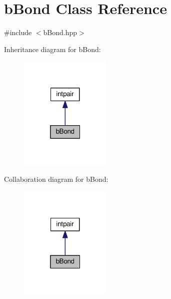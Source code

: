 \hypertarget{classbBond}{}\section{b\+Bond Class Reference}
\label{classbBond}


{\ttfamily \#include $<$b\+Bond.\+hpp$>$}



Inheritance diagram for b\+Bond\+:\nopagebreak
\begin{figure}[H]
\begin{center}
\leavevmode
\includegraphics[width=124pt]{classbBond__inherit__graph}
\end{center}
\end{figure}


Collaboration diagram for b\+Bond\+:\nopagebreak
\begin{figure}[H]
\begin{center}
\leavevmode
\includegraphics[width=124pt]{classbBond__coll__graph}
\end{center}
\end{figure}
